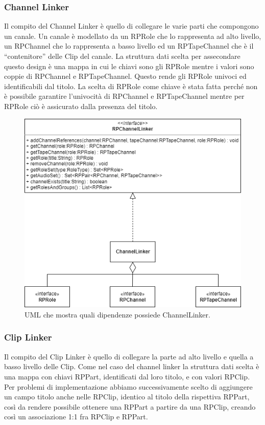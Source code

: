 \documentclass[a4paper,12pt]{report}
\begin{document}
\subsubsection{Channel Linker}
Il compito del Channel Linker è quello di collegare le varie parti che compongono un canale. Un canale è modellato da un RPRole che lo rappresenta ad alto livello, un RPChannel che lo rappresenta a basso livello ed un RPTapeChannel che è il “contenitore” delle Clip del canale. La struttura dati scelta per assecondare questo design è una mappa in cui le chiavi sono gli RPRole mentre i valori sono coppie di RPChannel e RPTapeChannel. Questo rende gli RPRole univoci ed identificabili dal titolo. La scelta di RPRole come chiave è stata fatta perché non è possibile garantire l’univocità di RPChannel e RPTapeChannel mentre per RPRole ciò è assicurato dalla presenza del titolo.

\begin{figure}[H]
\centering{}
\includegraphics[width=\textwidth]{img/channelLinker.png}
\caption{UML che mostra quali dipendenze possiede ChannelLinker.}
\end{figure}

\subsubsection{Clip Linker}
Il compito del Clip Linker è quello di collegare la parte ad alto livello e quella a basso livello delle Clip. Come nel caso del channel linker la struttura dati scelta è una mappa con chiavi RPPart, identificati dal loro titolo, e con valori RPClip. Per problemi di implementazione abbiamo successivamente scelto di aggiungere un campo titolo anche nelle RPClip, identico al titolo della rispettiva RPPart, così da rendere possibile ottenere una RPPart a partire da una RPClip, creando così un associazione 1:1 fra RPClip e RPPart.
\endsubsubsection
\end{document}
